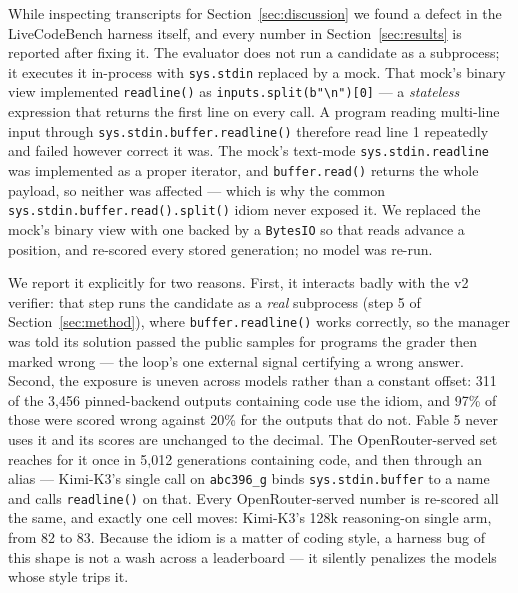 \documentclass{article}
\begin{document}
While inspecting transcripts for Section~\ref{sec:discussion} we found a defect in the
LiveCodeBench harness itself, and every number in Section~\ref{sec:results} is reported after
fixing it. The evaluator does not run a candidate as a subprocess; it executes it in-process with
\texttt{sys.stdin} replaced by a mock. That mock's binary view implemented \texttt{readline()} as
\texttt{inputs.split(b"\textbackslash n")[0]} --- a \emph{stateless} expression that returns the
first line on every call. A program reading multi-line input through
\texttt{sys.stdin.buffer.readline()} therefore read line 1 repeatedly and failed however correct it
was. The mock's text-mode \texttt{sys.stdin.readline} was implemented as a proper iterator, and
\texttt{buffer.read()} returns the whole payload, so neither was affected --- which is why the
common \texttt{sys.stdin.buffer.read().split()} idiom never exposed it. We replaced the mock's
binary view with one backed by a \texttt{BytesIO} so that reads advance a position, and re-scored
every stored generation; no model was re-run.

We report it explicitly for two reasons. First, it interacts badly with the v2 verifier: that step
runs the candidate as a \emph{real} subprocess (step 5 of Section~\ref{sec:method}), where
\texttt{buffer.readline()} works correctly, so the manager was told its solution passed the public
samples for programs the grader then marked wrong --- the loop's one external signal certifying a
wrong answer. Second, the exposure is uneven across models rather than a constant offset: 311 of the
3{,}456 pinned-backend outputs containing code use the idiom, and 97\% of those were scored wrong
against 20\% for the outputs that do not. Fable 5 never uses it and its scores are unchanged to the
decimal. The OpenRouter-served set reaches for it once in 5{,}012 generations containing code, and
then through an alias --- Kimi-K3's single call on \texttt{abc396\_g} binds
\texttt{sys.stdin.buffer} to a name and calls \texttt{readline()} on that. Every OpenRouter-served
number is re-scored all the same, and exactly one cell moves: Kimi-K3's 128k reasoning-on single
arm, from 82 to 83. Because the idiom is a matter of coding style, a harness bug of this shape is
not a wash across a leaderboard --- it silently penalizes the models whose style trips it.
\end{document}
